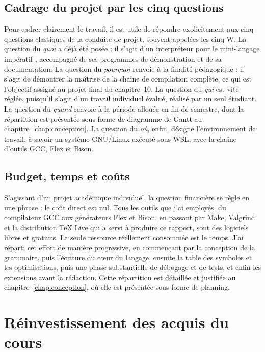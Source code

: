 \subsection{Cadrage du projet par les cinq questions}

Pour cadrer clairement le travail, il est utile de répondre explicitement aux cinq
questions classiques de la conduite de projet, souvent appelées les cinq W. La
question du \emph{quoi} a déjà été posée : il s'agit d'un interpréteur pour le
mini-langage impératif \ilang, accompagné de ses programmes de démonstration et de
sa documentation. La question du \emph{pourquoi} renvoie à la finalité
pédagogique : il s'agit de démontrer la maîtrise de la chaîne de compilation
complète, ce qui est l'objectif assigné au projet final du chapitre~10. La question
du \emph{qui} est vite réglée, puisqu'il s'agit d'un travail individuel évalué,
réalisé par un seul étudiant. La question du \emph{quand} renvoie à la période
allouée en fin de semestre, dont la répartition est présentée sous forme de
diagramme de Gantt au chapitre~\ref{chap:conception}. La question du \emph{où},
enfin, désigne l'environnement de travail, à savoir un système GNU/Linux exécuté
sous WSL, avec la chaîne d'outils GCC, Flex et Bison.

\subsection{Budget, temps et coûts}

S'agissant d'un projet académique individuel, la question financière se règle en
une phrase : le coût direct est nul. Tous les outils que j'ai employés, du
compilateur GCC aux générateurs Flex et Bison, en passant par Make, Valgrind et la
distribution \TeX{} Live qui a servi à produire ce rapport, sont des logiciels
libres et gratuits. La seule ressource réellement consommée est le temps. J'ai
réparti cet effort de manière progressive, en commençant par la conception de la
grammaire, puis l'écriture du c\oe ur du langage, ensuite la table des symboles et
les optimisations, puis une phase substantielle de débogage et de tests, et enfin
les extensions avant la rédaction. Cette répartition est détaillée et justifiée au
chapitre~\ref{chap:conception}, où elle est présentée sous forme de planning.

\section{Réinvestissement des acquis du cours}

